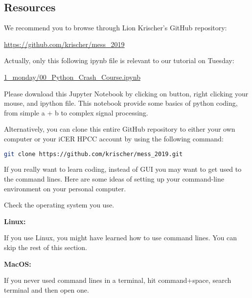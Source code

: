 \documentclass[12pt]{article}   	%
\begin{document}
\subsection*{Resources}
We recommend you to browse through Lion Krischer's GitHub repository:
\begin{center}
\href{https://github.com/krischer/mess\_2019}{https://github.com/krischer/mess\_2019} 
\end{center}
Actually, only this following ipynb file is relevant to our tutorial on Tuesday: 
\begin{center}
\href{https://raw.githubusercontent.com/krischer/mess_2019/master/1_monday/00_Python_Crash_Course.ipynb}{1\_monday/00\_Python\_Crash\_Course.ipynb}
\end{center}
Please download this Jupyter Notebook by clicking on   button, right clicking your mouse, and  ipython file. This notebook provide some basics 
of python coding, from simple a + b to complex signal processing.

Alternatively, you can clone this entire GitHub repository to either your own computer or your iCER HPCC account by using the following command: \\

\begin{lstlisting}[language=bash,keywordstyle=\color{blue!70},basicstyle=\ttfamily]
git clone https://github.com/krischer/mess_2019.git
\end{lstlisting}


If you really want to learn coding, instead of GUI you may want to get used to the command lines. 
Here are some ideas of  setting up your command-line environment on your personal computer.

Check the operating system you use. 

\textbf{Linux:} 

If you use Linux, you might have learned how to use command lines.  You can skip the rest of this section.

\textbf{MacOS:} 

If you never used command lines in a terminal, hit command+space, search terminal and then open one.
\end{document}
